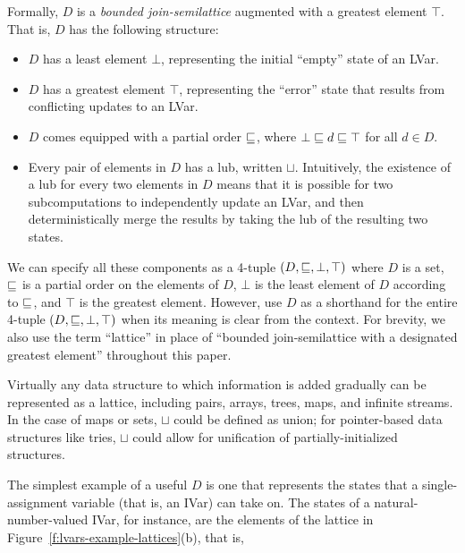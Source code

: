 Formally, $D$ is a \emph{bounded join-semilattice} augmented with a
greatest element $\top$.  That is, $D$ has the following structure:
\begin{itemize}
\item $D$ has a least element $\bot$, representing the initial
  ``empty'' state of an LVar.
\item $D$ has a greatest element $\top$, representing the ``error''
  state that results from conflicting updates to an LVar.
\item $D$ comes equipped with a partial order $\sqsubseteq$, where $\bot
  \sqsubseteq d \sqsubseteq \top$ for all $d \in D$.
\item Every pair of elements in $D$ has a lub, written $\sqcup$.
  Intuitively, the existence of a lub for every two elements in $D$
  means that it is possible for two subcomputations to independently
  update an LVar, and then deterministically merge the results by
  taking the lub of the resulting two states.
\end{itemize}
We can specify all these components as a 4-tuple $(D, \sqsubseteq, \bot,
\top)$ where $D$ is a set, $\sqsubseteq$ is a partial order on the
elements of $D$, $\bot$ is the least element of $D$ according to
$\sqsubseteq$, and $\top$ is the greatest element.  However,  use $D$ as a
shorthand for the entire 4-tuple $(D, \sqsubseteq, \bot, \top)$ when its
meaning is clear from the context.
\ifdefined\JOURNAL
For brevity, we also use the term
``lattice'' in place of ``bounded join-semilattice with a designated
greatest element'' throughout this paper.
\fi

Virtually any data structure to which information is added gradually
can be represented as a lattice, including pairs, arrays, trees, maps,
and infinite streams.  In the case of maps or sets, $\sqcup$ could be
defined as union; for pointer-based data structures like tries, $\sqcup$
could allow for unification of partially-initialized structures.


The simplest example of a useful $D$ is one that represents the
states that a single-assignment variable (that is, an IVar) can take
on.  The states of a natural-number-valued IVar, for instance, are the elements of
the lattice in
Figure~\ref{f:lvars-example-lattices}(b), that is,

